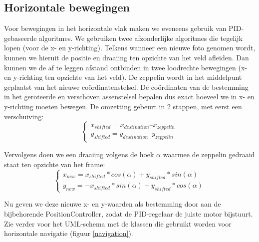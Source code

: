 \documentclass[eind]{penoverslag}
\begin{document}
\subsection{Horizontale bewegingen}
Voor bewegingen in het horizontale vlak maken we eveneens gebruik van PID-gebaseerde algoritmes. We gebruiken twee afzonderlijke algoritmes die tegelijk lopen (voor de x- en y-richting). Telkens wanneer een nieuwe foto genomen wordt, kunnen we hieruit de positie en draaiing ten opzichte van het veld afleiden. Dan kunnen we de af te leggen afstand ontbinden in twee loodrechte bewegingen (x- en y-richting ten opzichte van het veld). De zeppelin wordt in het middelpunt geplaatst van het nieuwe co\"{o}rdinatenstelsel. De co\"{o}rdinaten van de bestemming in het geroteerde en verschoven assenstelsel bepalen dus exact hoeveel we in x- en y-richting moeten bewegen. De omzetting gebeurt in 2 stappen, met eerst een verschuiving:
\begin{equation}
 \begin{cases}
  x_{shifted} = x_{destination} – x_{zeppelin}\\
  y_{shifted} = y_{destination} – y_{zeppelin}
 \end{cases}
\end{equation}



Vervolgens doen we een draaiing volgens de hoek $\alpha$ waarmee de zeppelin gedraaid staat ten opzichte van het frame:
\begin{equation}
 \begin{cases}
 x_{new} = x_{shifted}*cos(\alpha) + y_{shifted}*sin(\alpha)\\
y_{new} = -x_{shifted}*sin(\alpha) + y_{shifted}*cos(\alpha)
 \end{cases}
\end{equation}

Nu geven we deze nieuwe x- en y-waarden als bestemming door aan de bijbehorende PositionController, zodat de PID-regelaar de juiste motor bijstuurt. Zie verder voor het UML-schema met de klassen die gebruikt worden voor horizontale navigatie (figuur \ref{navigation}).
\end{document}
